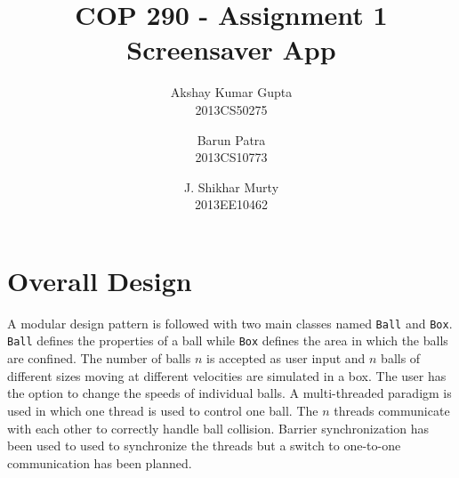 \documentclass[]{article}
\begin{document}
\title{COP 290 - Assignment 1\\Screensaver App}
\author{Akshay Kumar Gupta\\ 2013CS50275 \and  Barun Patra\\{2013CS10773} \and J. Shikhar Murty\\{2013EE10462}}
\date{}
\maketitle
\section{Overall Design}
A modular design pattern is followed with two main classes named \texttt{Ball} and \texttt{Box}. \texttt{Ball} defines the properties of a ball while \texttt{Box} defines the area in which the balls are confined. The number of balls $n$ is accepted as user input and $n$ balls of different sizes moving at different velocities are simulated in a box. The user has the option to change the speeds of individual balls. A multi-threaded paradigm is used in which one thread is used to control one ball. The $n$ threads communicate with each other to correctly handle ball collision. Barrier synchronization has been used to used to synchronize the threads but a switch to one-to-one communication has been planned.
\end{document}
